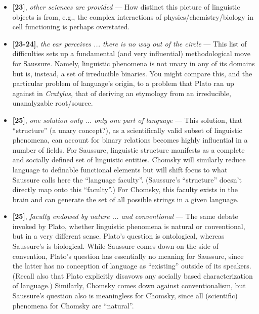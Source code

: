 \documentclass[12pt]{article}
\begin{document}
\begin{itemize}

\item \textbf{[23]}, \textit{other sciences are provided} --- How distinct this picture of linguistic objects is from, e.g., the complex interactions of physics/chemistry/biology in cell functioning is perhaps overstated.

\item \textbf{[23-24]}, \textit{the ear perceives ... there is no way out of the circle} --- This list of difficulties sets up a fundamental (and very influential) methodological move for Saussure. Namely, linguistic phenomena is not unary in any of its domains but is, instead, a set of irreducible binaries. You might compare this, and the particular problem of language's origin, to a problem that Plato ran up against in \textit{Cratylus}, that of deriving an etymology from an irreducible, unanalyzable root/source.

\item \textbf{[25]}, \textit{one solution only ... only one part of language} --- This solution, that ``structure'' (a unary concept?), as a scientifically valid subset of linguistic phenomena, can account for binary relations becomes highly influential in a number of fields. For Saussure, linguistic structure manifests as a complete and socially defined set of linguistic entities. Chomsky will similarly reduce language to definable functional elements but will shift focus to what Saussure calls here the ``language faculty''. (Saussure's ``structure'' doesn't directly map onto this ``faculty''.) For Chomsky, this faculty exists in the brain and can generate the set of all possible strings in a given language.

\item \textbf{[25]}, \textit{faculty endowed by nature ... and conventional} --- The same debate invoked by Plato, whether linguistic phenomena is natural or conventional, but in a very different sense. Plato's question is ontological, whereas Saussure's is biological. While Saussure comes down on the side of convention, Plato's question has essentially no meaning for Saussure, since the latter has no conception of language as ``existing'' outside of its speakers. (Recall also that Plato explicitly disavows any socially based characterization of language.) Similarly, Chomsky comes down against conventionalism, but Saussure's question also is meaningless for Chomsky, since all (scientific) phenomena for Chomsky are ``natural''.


\end{itemize}
\end{document}
